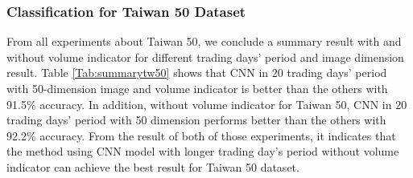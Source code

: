 \documentclass[10pt,twocolumn]{article}
\begin{document}
\subsubsection{Classification for Taiwan 50 Dataset}
From all experiments about Taiwan 50, we conclude a summary result with and without volume indicator for different trading days’ period and image dimension result. Table \ref{Tab:summarytw50} shows that CNN in 20 trading days’ period with 50-dimension image and volume indicator is better than the others with 91.5\% accuracy. In addition, without volume indicator for Taiwan 50, CNN in 20 trading days’ period with 50 dimension performs better than the others with 92.2\% accuracy. From the result of both of those experiments, it indicates that the method using CNN model with longer trading day’s period without volume indicator can achieve the best result for Taiwan 50 dataset.
 \begin{table}[H]
 \centering
 \caption{Summary result of Taiwan 50 with their best classifier for each trading days and image dimension.}
 \label{Tab:summarytw50}
 \end{table}
\end{document}
